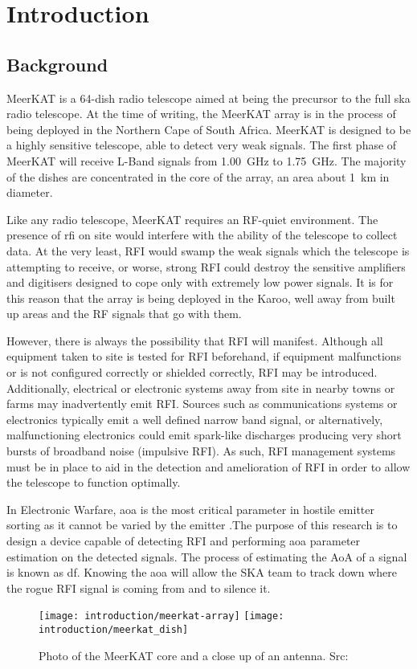 \chapter{Introduction}
\label{ch:introduction}
\section{Background}
MeerKAT is a 64-dish radio telescope aimed at being the precursor to the full \gls{ska} radio telescope. At the time of writing, the MeerKAT array is in the process of being deployed in the Northern Cape of South Africa.
MeerKAT is designed to be a highly sensitive telescope, able to detect very weak signals. The first phase of MeerKAT will receive L-Band signals from \SI{1.00}{\giga\hertz} to \SI{1.75}{\giga\hertz}. The majority of the dishes are concentrated in the core of the array, an area about \SI{1}{\kilo\meter} in diameter.

Like any radio telescope, MeerKAT requires an RF-quiet environment.
The presence of \gls{rfi} on site would interfere with the ability of the telescope to collect data. At the very least, RFI would swamp the weak signals which the telescope is attempting to receive, or  worse, strong RFI could destroy the sensitive amplifiers and digitisers designed to cope only with extremely low power signals.
It is for this reason that the array is being deployed in the Karoo, well away from built up areas and the RF signals that go with them.

However, there is always the possibility that RFI will manifest. 
Although all equipment taken to site is tested for RFI beforehand, if equipment malfunctions or is not configured correctly or shielded correctly, RFI may be introduced. Additionally, electrical or electronic systems away from site in nearby towns or farms may inadvertently emit RFI. 
Sources such as communications systems or electronics typically emit a well defined narrow band signal, or alternatively, malfunctioning electronics could emit spark-like discharges producing very short bursts of broadband noise (impulsive RFI).
As such, RFI management systems must be in place to aid in the detection and amelioration of RFI in order to allow the telescope to function optimally. 

In Electronic Warfare, \gls{aoa} is the most critical parameter in hostile emitter sorting as it cannot be varied by the emitter \cite{center2012electronic}.The purpose of this research is to design a device capable of detecting RFI and performing \gls{aoa} parameter estimation on the detected signals.
The process of estimating the AoA of a signal is known as \gls{df}.
Knowing the \gls{aoa} will allow the SKA team to track down where the rogue RFI signal is coming from and to silence it.

\begin{figure}[hb]
  \centering
  \texttt{[image: introduction/meerkat-array]}
  \texttt{[image: introduction/meerkat\_dish]}
  \caption{Photo of the MeerKAT core and a close up of an antenna. Src: \cite{skasawebsite}}
\end{figure}



